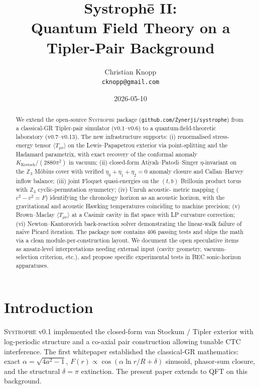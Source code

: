 \documentclass[11pt,a4paper]{article}
\title{\bfseries Systroph\=e II: \\
Quantum Field Theory on a Tipler-Pair Background}
\author{Christian Knopp\\\texttt{cknopp@gmail.com}}
\date{2026-05-10}
\begin{document}
\maketitle

\begin{abstract}
We extend the open-source \textsc{Systroph\=e} package
(\texttt{github.com/Zynerji/systrophe}) from a classical-GR
Tipler-pair simulator (v0.1--v0.6) to a quantum-field-theoretic
laboratory (v0.7--v0.13). The new infrastructure supports:
(i) renormalised stress-energy tensor $\langle T_{\mu\nu} \rangle$ on
the Lewis--Papapetrou exterior via point-splitting and the Hadamard
parametrix, with exact recovery of the conformal anomaly
$K_{\text{Kretsch}} / (2880 \pi^2)$ in vacuum; (ii) closed-form
Atiyah--Patodi--Singer $\eta$-invariant on the $\mathbb{Z}_3$
M\"obius cover with verified $\eta_0 + \eta_1 + \eta_2 = 0$
anomaly closure and Callan--Harvey inflow balance; (iii) joint
Floquet quasi-energies on the $(t, b)$ Brillouin product torus with
$\mathbb{Z}_3$ cyclic-permutation symmetry; (iv) Unruh acoustic-
metric mapping ($c^2 - v^2 = F$) identifying the chronology horizon
as an acoustic horizon, with the gravitational and acoustic Hawking
temperatures coinciding to machine precision; (v) Brown--Maclay
$\langle T_{\mu\nu} \rangle$ at a Casimir cavity in flat space with
LP curvature correction; (vi) Newton--Kantorovich back-reaction
solver demonstrating the linear-walk failure of na\"ive Picard
iteration. The package now contains 406 passing tests and ships
the math via a clean module-per-construction layout. We document
the open speculative items as ansatz-level interpretations needing
external input (cavity geometry, vacuum-selection criterion, etc.),
and propose specific experimental tests in BEC sonic-horizon
apparatuses.
\end{abstract}

\section{Introduction}

\textsc{Systroph\=e} v0.1 implemented the closed-form van Stockum /
Tipler exterior with log-periodic structure and a co-axial pair
construction allowing tunable CTC interference. The first whitepaper
\cite{Knopp2026Systrophe} established the classical-GR mathematics:
exact $\alpha = \sqrt{4a^2-1}$, $F(r) \propto \cos(\alpha \ln r/R + \delta)$
sinusoid, phasor-sum closure, and the structural $\delta = \pi$
extinction. The present paper extends to QFT on this background.
\end{document}

